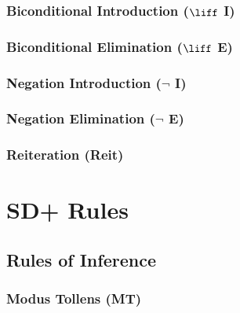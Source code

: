 \documentclass{hitec}
\begin{document}
\subsubsection{Biconditional Introduction ($\liff$ I)}
\subsubsection{Biconditional Elimination ($\liff$ E)}
\subsubsection{Negation Introduction ($\lnot$ I)}
\subsubsection{Negation Elimination ($\lnot$ E)}
\subsubsection{Reiteration (Reit)}
\section{SD+ Rules}
\subsection{Rules of Inference}
\subsubsection{Modus Tollens (MT)}
\end{document}
